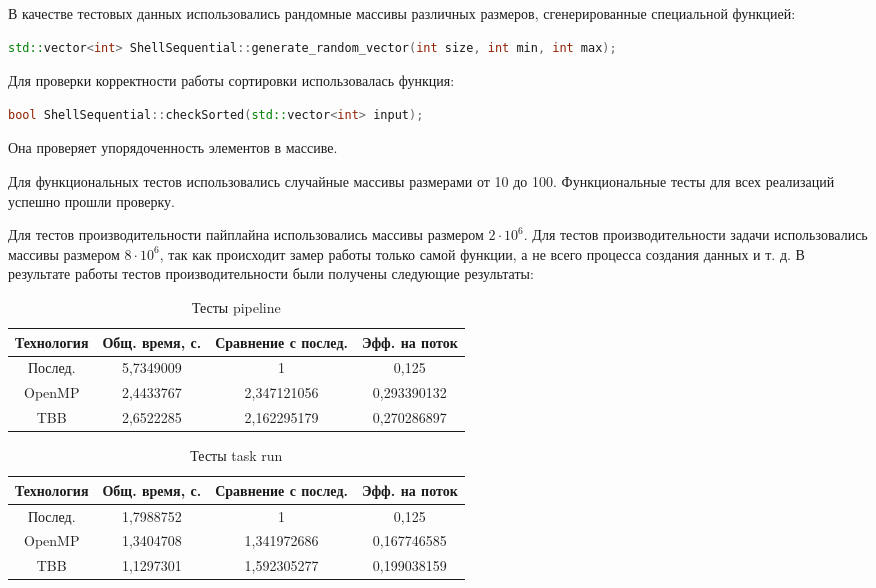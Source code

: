 \documentclass[]{article}
\theoremstyle{remark}
\theoremstyle{definition}
\begin{document}
\par В качестве тестовых данных использовались рандомные массивы различных размеров, сгенерированные специальной функцией:
\begin{lstlisting}[language=C++]
std::vector<int> ShellSequential::generate_random_vector(int size, int min, int max);
\end{lstlisting}

\par Для проверки корректности работы сортировки использовалась функция:

\begin{lstlisting}[language=C++]
bool ShellSequential::checkSorted(std::vector<int> input);
\end{lstlisting}

\par Она проверяет упорядоченность элементов в массиве.

\par Для функциональных тестов использовались случайные массивы размерами от 10 до 100. Функциональные тесты для всех реализаций успешно прошли проверку.

\par Для тестов производительности пайплайна использовались массивы размером $2 \cdot 10^6$. Для тестов производительности задачи использовались массивы размером $8 \cdot 10^6$, так как происходит замер работы только самой функции, а не всего процесса создания данных и т. д. В результате работы тестов производительности были получены следующие результаты:

\begin{table}[h!]
    \begin{center}
        \begin{tabular}{ |c|c|c|c| } 
        \hline
        Технология & Общ. время, с. & Сравнение с послед. & Эфф. на поток  \\
        \hline
        Послед. & 5,7349009 & 1 & 0,125 \\
        OpenMP & 2,4433767 & 2,347121056 & 0,293390132 \\
        TBB & 2,6522285 & 2,162295179 & 0,270286897 \\
        \hline
        \end{tabular}
    \end{center}
    \caption{Тесты pipeline}
\end{table}

\begin{table}[h]
    \begin{center}
        \begin{tabular}{ |c|c|c|c| } 
        \hline
        Технология & Общ. время, с. & Сравнение с послед. & Эфф. на поток  \\
        \hline
        Послед. & 1,7988752 & 1 & 0,125 \\
        OpenMP & 1,3404708 & 1,341972686 & 0,167746585 \\
        TBB & 1,1297301 & 1,592305277 & 0,199038159 \\
        \hline
        \end{tabular}
    \end{center}
    \caption{Тесты task run}
\end{table}
\end{document}
